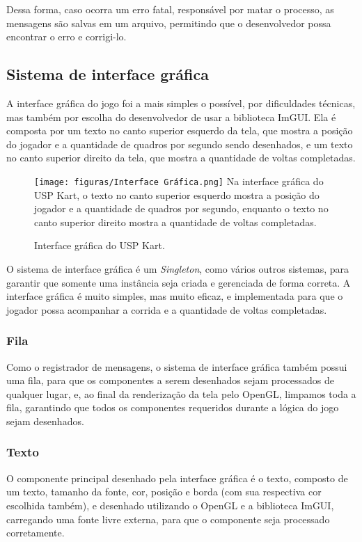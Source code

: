 Dessa forma, caso ocorra um erro fatal, responsável por matar o processo, as mensagens são salvas em um arquivo, permitindo que o desenvolvedor possa encontrar o erro e corrigi-lo.

\subsection{Sistema de interface gráfica}

A interface gráfica do jogo foi a mais simples o possível, por dificuldades técnicas, mas também por escolha do desenvolvedor de usar a biblioteca ImGUI. Ela é composta por um texto no canto superior esquerdo da tela, que mostra a posição do jogador e a quantidade de quadros por segundo sendo desenhados, e um texto no canto superior direito da tela, que mostra a quantidade de voltas completadas.

\begin{figure}[H]
    \centering
    \texttt{[image: figuras/Interface Gráfica.png]}
    \footnotesize{Na interface gráfica do USP Kart, o texto no canto superior esquerdo mostra a posição do jogador e a quantidade de quadros por segundo, enquanto o texto no canto superior direito mostra a quantidade de voltas completadas.}
    \caption{Interface gráfica do USP Kart.}
\end{figure}

O sistema de interface gráfica é um \textit{Singleton}, como vários outros sistemas, para garantir que somente uma instância seja criada e gerenciada de forma correta. A interface gráfica é muito simples, mas muito eficaz, e implementada para que o jogador possa acompanhar a corrida e a quantidade de voltas completadas.

\subsubsection{Fila}
Como o registrador de mensagens, o sistema de interface gráfica também possui uma fila, para que os componentes a serem desenhados sejam processados de qualquer lugar, e, ao final da renderização da tela pelo OpenGL, limpamos toda a fila, garantindo que todos os componentes requeridos durante a lógica do jogo sejam desenhados.

\subsubsection{Texto}

O componente principal desenhado pela interface gráfica é o texto, composto de um texto, tamanho da fonte, cor, posição e borda (com sua respectiva cor escolhida também), e desenhado utilizando o OpenGL e a biblioteca ImGUI, carregando uma fonte livre externa, para que o componente seja processado corretamente.

